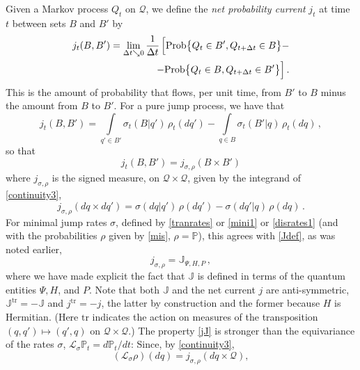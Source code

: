 \documentclass[12pt]{article}
\newcommand{\1}{\mathbf{1}} %
\newcommand{\tr}{\mathrm{tr}} %
\newcommand{\conf}{\mathcal{Q}} %
\newcommand{\prob}{\mathrm{Prob}}
\newcommand{\measure}{\mathbb{P}} %
\newcommand{\current}{\mathbb{J}}
\newcommand{\generator}{\mathscr{L}} %
\newcommand{\pov}{{P}}%
\begin{document}
Given a Markov process $Q_t$ on $\conf$, we define the \emph{net
probability current} $j_t$ at time $t$ between sets $B$ and $B'$ by
\begin{eqnarray}\label{jdefcont}
     j_t(B,B') = \lim_{\Delta t \searrow 0} \frac{1}{\Delta t}
\hspace{-3ex}
   &&
     \Big[ \prob\big\{Q_{t}\in B',Q_{t+\Delta t}\in B  \big\} -
   \\\nonumber
   &&
   - \prob \big\{ Q_{t}\in B, Q_{t+\Delta t} \in B' \big\} \Big]\,.
\end{eqnarray}
This is the amount of probability that flows, per unit time, from $B'$
to $B$ minus the amount from $B$ to $B'$.  For a pure jump process, we
have that
\begin{equation}\label{jrate}
   j_t(B,B') = \int\limits_{q'\in B'} \sigma_t(B|q')\, \rho_t(dq') -
   \int\limits_{q\in B} \sigma_t(B'|q)\, \rho_t(dq)\,,
\end{equation}
so that
\begin{equation}
j_t(B,B') = j_{\sigma,\rho}(B \times B')
\end{equation}
where $j_{\sigma,\rho}$ is the signed measure, on $\conf \times
\conf$, given by the integrand of \eqref{continuity3},
\begin{equation}\label{jsigma}
   j_{\sigma,\rho} (dq \times dq') = \sigma(dq|q') \, \rho(dq') -
   \sigma(dq'|q) \, \rho(dq)\,.
\end{equation}
For minimal jump rates $\sigma$, defined by \eqref{tranrates} or
\eqref{mini1} or \eqref{disrates1} (and with the probabilities $\rho$
given by \eqref{mis}, $\rho = \measure$), this agrees with \eqref{Jdef},
as was noted earlier,
\begin{equation}\label{jJ}
   j_{\sigma,\rho} = \current_{\Psi,H,\pov} \,,
\end{equation}
where we have made explicit the fact that $\current$ is defined in
terms of the quantum entities $\Psi, H$, and $\pov$. Note that both
$\current$ and the net current $j$ are anti-symmetric, $\current^\tr =
-\current$ and $j^\tr = -j$, the latter by construction and the former
because $H$ is Hermitian. (Here $\tr$ indicates the action on measures
of the transposition $(q,q') \mapsto (q',q)$ on $\conf \times \conf$.)
The property \eqref{jJ} is stronger than the equivariance of the rates
$\sigma$, $\generator_\sigma \measure_t = d\measure_t / dt$: Since, by
\eqref{continuity3},
\begin{equation}
   (\generator_\sigma \rho) (dq) = j_{\sigma,\rho} (dq \times \conf),
\end{equation}
\end{document}
